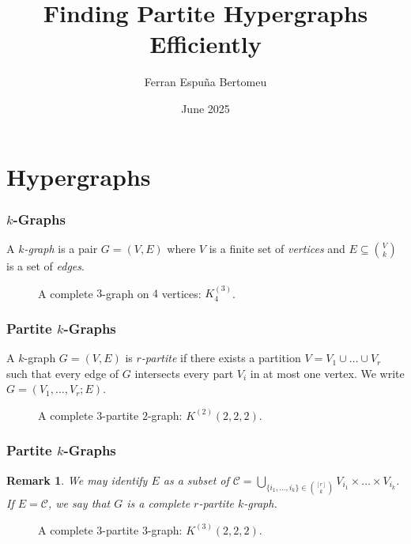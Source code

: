 \documentclass[aspectratio=169]{beamer}
\title[Finding Partite Hypergraphs Efficiently]{Finding Partite Hypergraphs Efficiently}
\author{Ferran Espuña Bertomeu}
\institute{Supervisor: Richard Lang}
\date{June 2025}
\theoremstyle{mystyle}
\newtheorem*{remark}{Remark}
\begin{document}
\frame{\titlepage}

\frame{\tableofcontents}

\section{Hypergraphs}\label{sec:notation}

\begin{frame}
    \frametitle{$k$-Graphs}
    \begin{definition}
        A \emph{$k$-graph} is a pair $G = (V, E)$
        where $V$ is a finite set of \emph{vertices} and
        $E \subseteq \binom{V}{k}$ is a set of \emph{edges}.
    \end{definition}
    \begin{figure}[htbp]
        \centering
        \scalebox{0.7}{
            
        }
        \caption{A complete $3$-graph on $4$ vertices: $K_4^{(3)}$.}
        \label{fig:complete_kgraph}
    \end{figure}
\end{frame}

\begin{frame}
    \frametitle{Partite $k$-Graphs}
    \begin{definition}
        A $k$-graph $G = (V, E)$ is \emph{$r$-partite}
        if there exists a partition $V = V_1 \cup \dots \cup V_r$
        such that every edge of $G$ intersects every part $V_i$ in at most one vertex.
        We write $G = (V_1, \dots, V_r; E)$.
    \end{definition}

    \begin{figure}[htbp]
        \centering
        \scalebox{0.6}{
            
        }
        \caption{A complete $3$-partite $2$-graph: $K^{(2)}(2, 2, 2)$.}
        \label{fig:complete_3partite_2graph}
    \end{figure}
\end{frame}

\begin{frame}
    \frametitle{Partite $k$-Graphs}
    \begin{remark}
        We may identify $E$ as a subset of $\mathcal{C} = \bigcup_{\{i_1, \dots, i_k \} \in \binom{[r]}{k}} V_{i_1} \times \dots \times V_{i_k}$.
        If $E = \mathcal{C}$, we say that $G$ is a \emph{complete} $r$-partite $k$-graph.
    \end{remark}

    \begin{figure}[htbp]
        \centering
        \scalebox{0.55}{
            
        }
        \caption{A complete $3$-partite $3$-graph: $K^{(3)}(2, 2, 2)$.}
        \label{fig:complete_3partite_3graph}
    \end{figure}
\end{frame}
\end{document}
